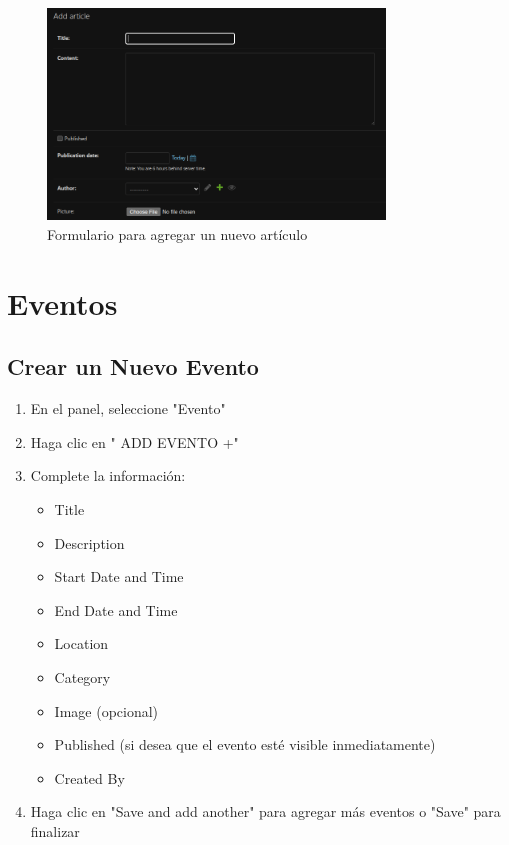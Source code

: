 \documentclass[12pt,letterpaper]{report}
\begin{document}
\begin{figure}[H]
    \centering
    \includegraphics[width=0.8\textwidth]{images/article.png}
    \caption{Formulario para agregar un nuevo artículo}
\end{figure}

\section{Eventos}
\subsection{Crear un Nuevo Evento}
\begin{enumerate}
    \item En el panel, seleccione "Evento"
    \item Haga clic en " ADD EVENTO +"
    \item Complete la información:
        \begin{itemize}
            \item Title
            \item Description
            \item Start Date and Time
            \item End Date and Time
            \item Location
            \item Category
            \item Image (opcional)
            \item Published (si desea que el evento esté visible inmediatamente)
            \item Created By
        \end{itemize}
    \item Haga clic en "Save and add another" para agregar más eventos o "Save" para finalizar
\end{enumerate}
\end{document}
